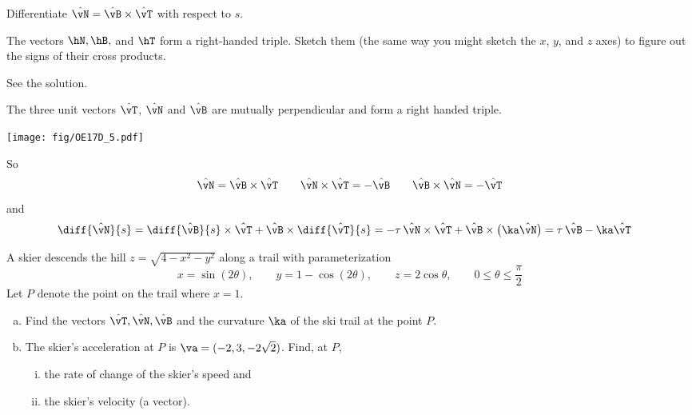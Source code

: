 \begin{hint} 
Differentiate $\hat\vN =\hat\vB\times\hat\vT$ with respect to $s$. 

The vectors $\hN, \hB,$ and $\hT$ form a right-handed triple. Sketch them (the same way you might sketch the $x$, $y$, and $z$ axes) to figure out the signs of their cross products.
\end{hint}

\begin{answer} 
See the solution.
\end{answer}

\begin{solution} 
The three unit vectors $\hat\vT$, $\hat\vN$ and $\hat\vB$ are 
mutually perpendicular and form a right handed triple.
\begin{center}
     \texttt{[image: fig/OE17D\_5.pdf]}
\end{center}
So
\begin{equation*}
\hat\vN = \hat\vB\times\hat\vT \qquad
\hat\vN\times\hat\vT = -\hat\vB \qquad
\hat\vB\times\hat\vN = -\hat\vT
\end{equation*}
and
\begin{align*}
\diff{\hat\vN}{s} & = \diff{\hat\vB}{s}\times\hat\vT
                     +\hat\vB\times \diff{\hat\vT}{s}
= -\tau\,\hat\vN\times\hat\vT
                     +\hat\vB\times\big(\ka\hat\vN\big)
= \tau\,\hat\vB - \ka\hat\vT
\end{align*}
\end{solution}


\begin{question}[M317 2000D] %
 A skier descends the hill $z =\sqrt{4-x^2-y^2}$ along a trail with 
parameterization
$$
x=\sin(2\theta),\qquad y=1-\cos(2\theta),\qquad z=2\cos\theta,\qquad
 0\le\theta\le\frac{\pi}{2}
$$
   Let $P$ denote the point on the trail where $x = 1$.
\begin{enumerate}[(a)]
\item
   Find the vectors $\hat\vT, \hat\vN, \hat\vB$ and 
   the curvature $\ka$ of the ski trail at the point $P$.
                                                         
\item
The skier's acceleration at $P$ is $\va = (-2, 3, -2\sqrt{2})$.
           Find, at $P$,
\begin{enumerate}[(i)]
\item
the rate of change of the skier's speed and
\item
the skier's velocity (a vector).
\end{enumerate}
\end{enumerate}

\end{question}

